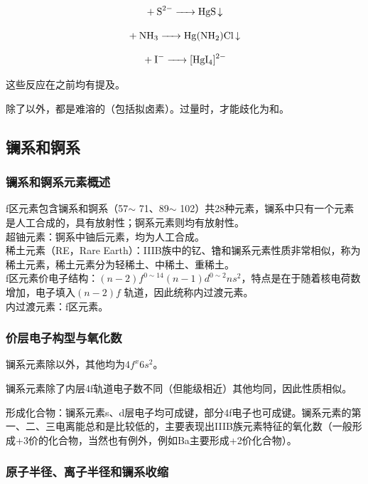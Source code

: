 \documentclass[a4paper,UTF8]{article}
\begin{document}
$$ \ce{+ S^{2-} -> HgS v} $$

$$ \ce{+ NH3 -> Hg(NH2)Cl v} $$

$$ \ce{+ I- -> [HgI4]^{2-}} $$

这些反应在之前均有提及。

除了以外，都是难溶的（包括拟卤素）。过量时，才能歧化为和。

\subsection{镧系和锕系}

\subsubsection{镧系和锕系元素概述}

f区元素包含镧系和锕系（57$\sim$ 71、89$\sim$ 102）共28种元素，镧系中只有一个元素是人工合成的，具有放射性；锕系元素则均有放射性。\\

超铀元素：锕系中铀后元素，均为人工合成。\\

稀土元素（RE，Rare Earth）：IIIB族中的钇、镥和镧系元素性质非常相似，称为稀土元素，稀土元素分为轻稀土、中稀土、重稀土。\\

f区元素价电子结构：$ (n-2)f^{0\sim 14} (n-1)d^{0\sim 2} ns^2 $，特点是在于随着核电荷数增加，电子填入$ (n-2)f $ 轨道，因此统称内过渡元素。\\

内过渡元素：f区元素。\\

\subsubsection{价层电子构型与氧化数}

镧系元素除以外，其他均为$ 4f^x6s^2 $。

镧系元素除了内层4f轨道电子数不同（但能级相近）其他均同，因此性质相似。

形成化合物：镧系元素s、d层电子均可成键，部分4f电子也可成键。镧系元素的第一、二、三电离能总和是比较低的，主要表现出IIIB族元素特征的氧化数（一般形成+3价的化合物，当然也有例外，例如Ba主要形成+2价化合物）。

\subsubsection{原子半径、离子半径和镧系收缩}
\end{document}
